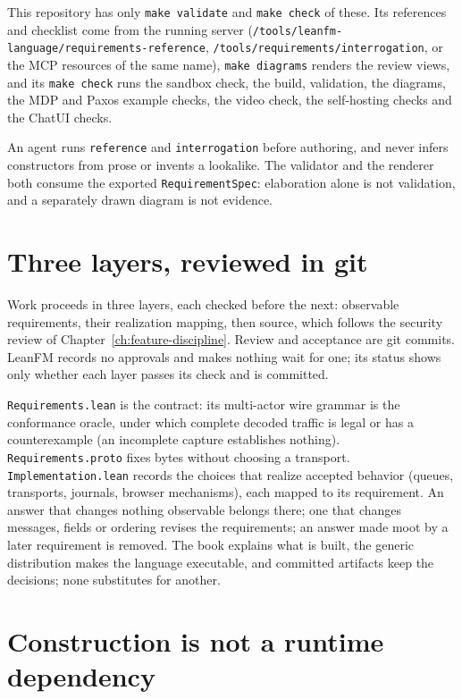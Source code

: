 \noindent This repository has only \texttt{make validate} and \texttt{make check}
of these. Its references and checklist come from the running server
(\texttt{/tools/leanfm-language/requirements-reference},
\texttt{/tools/requirements/interrogation}, or the MCP resources of the same
name), \texttt{make diagrams} renders the review views, and its \texttt{make check}
runs the sandbox check, the build, validation, the diagrams, the MDP and Paxos
example checks, the video check, the self-hosting checks and the ChatUI checks.

An agent runs \texttt{reference} and \texttt{interrogation} before authoring, and
never infers constructors from prose or invents a lookalike. The validator and the
renderer both consume the exported \texttt{RequirementSpec}: elaboration alone is
not validation, and a separately drawn diagram is not evidence.

\section{Three layers, reviewed in git}
\label{sec:three-layers}

Work proceeds in three layers, each checked before the next: observable
requirements, their realization mapping, then source, which follows the security
review of Chapter~\ref{ch:feature-discipline}. Review and acceptance are git
commits. LeanFM records no approvals and makes nothing wait for one; its status
shows only whether each layer passes its check and is committed.

\texttt{Requirements.lean} is the contract: its multi-actor wire grammar is the
conformance oracle, under which complete decoded traffic is legal or has a
counterexample (an incomplete capture establishes nothing).
\texttt{Requirements.proto} fixes bytes without choosing a transport.
\texttt{Implementation.lean} records the choices that realize accepted behavior
(queues, transports, journals, browser mechanisms), each mapped to its
requirement. An answer that changes nothing observable belongs there; one that
changes messages, fields or ordering revises the requirements; an answer made moot
by a later requirement is removed. The book explains what is built, the generic
distribution makes the language executable, and committed artifacts keep the
decisions; none substitutes for another.

\section{Construction is not a runtime dependency}

